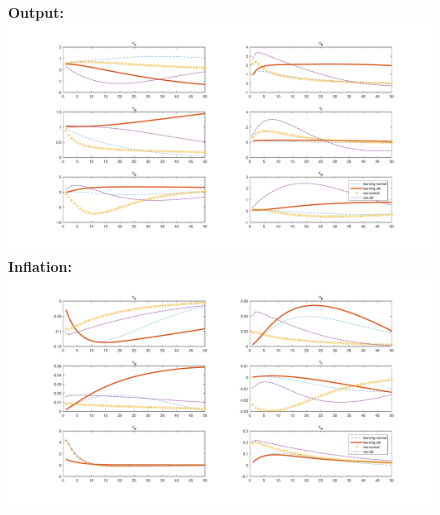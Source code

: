 \documentclass[12pt,reqno]{article}
\numberwithin{equation}{section}
\begin{document}
\begin{figure}[H]
\label{irf_ar1_2}
\textbf{Output:}\\
\includegraphics[scale=0.5]{AR1_impresp_output_riseComp.pdf}
\textbf{Inflation:}\\
\includegraphics[scale=0.5]{AR1_impresp_pinf_riseComp.pdf}

\end{figure}
\end{document}
